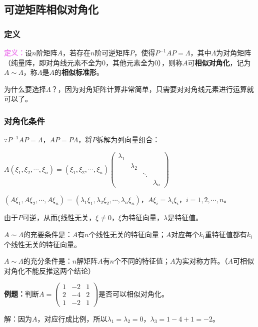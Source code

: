 \documentclass[UTF8, 12pt]{ctexart}
\begin{document}
\subsection{可逆矩阵相似对角化}

\subsubsection{定义}

\textcolor{violet}{\textbf{定义：}}设$n$阶矩阵$A$，若存在$n$阶可逆矩阵$P$，使得$P^{-1}AP=\Lambda$，其中$\Lambda$为对角矩阵（纯量阵，即对角线元素不全为0，其他元素全为0），则称$A$可\textbf{相似对角化}，记为$A\sim\Lambda$，称$\Lambda$是$A$的\textbf{相似标准形}。

为什么要选择$\Lambda$？，因为对角矩阵计算非常简单，只需要对对角线元素进行运算就可以了。

\subsubsection{对角化条件}

$\because P^{-1}AP=\Lambda$，$AP=P\Lambda$，将$P$拆解为列向量组合：

$A(\xi_1,\xi_2,\cdots,\xi_n)=(\xi_1,\xi_2,\cdots,\xi_n)\left(\begin{array}{cccc}
\lambda_1 \\
& \lambda_2 \\
& & \ddots \\
& & & \lambda_n
\end{array}\right)$

$(A\xi_1,A\xi_2,\cdots,A\xi_n)=(\lambda_1\xi_1,\lambda_2\xi_2,\cdots,\lambda_n\xi_n)$，$A\xi_i=\lambda_i\xi_i$，$i=1,2,\cdots,n$。

由于$P$可逆，从而$\xi$线性无关，$\xi\neq0$，$\xi$为特征向量，$\lambda$是特征值。

$A\sim\Lambda$的充要条件是：$A$有$n$个线性无关的特征向量；$A$对应每个$k_i$重特征值都有$k_i$个线性无关的特征向量。

$A\sim\Lambda$的充分条件是：$n$解矩阵$A$有$n$个不同的特征值；$A$为实对称方阵。（$A$可相似对角化不能反推这两个结论）

\textbf{例题：}判断$A=\left(\begin{array}{ccc}
1 & -2 & 1 \\
2 & -4 & 2 \\
1 & -2 & 1
\end{array}\right)$是否可以相似对角化。

解：因为$A$，对应行成比例，所以$\lambda_1=\lambda_2=0$，$\lambda_3=1-4+1=-2$。
\end{document}
